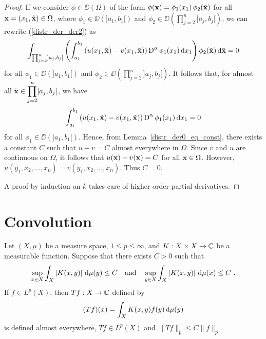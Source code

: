 \begin{proof}
If we consider $\phi \in \DD(\Omega)$ of the form
$\displaystyle \phi(\mathbf{x}) = \phi_1(x_1) \, \phi_2(\tilde{\mathbf{x}})$ for all
$\mathbf{x} = (x_1,\tilde{\mathbf{x}}) \in \Omega$, where
$\phi_1 \in \DD(]a_1,b_1[)$ and
$\displaystyle \phi_2 \in \DD\left(\prod_{j=2}^n]a_j,b_j[\right)$, we
can rewrite (\ref{distr_der_der2}) as
\[
\int_{\prod_{j=2}^n]a_j,b_j[} \left( \int_{a_1}^{b_1}
\left(u(x_1,\tilde{\mathbf{x}}) - v(x_1,\tilde{\mathbf{x}})\right)
\operatorname{D}^\alpha \phi_1(x_1) \,\mathrm{d}{x_1} \right) \phi_2(\tilde{\mathbf{x}})
\,\mathrm{d}{\tilde{\mathbf{x}}} = 0
\]
for all $\phi_1 \in \DD(]a_1,b_1[)$ and
$\displaystyle \phi_2 \in \DD\left(\prod_{j=2}^n]a_j,b_j[\right)$.
It follows that, for almost all
$\displaystyle \tilde{\mathbf{x}} \in \prod_{j=2}^n]a_j,b_j[$, we have
\[
\int_{a_1}^{b_1}
\left(u(x_1,\tilde{\mathbf{x}}) - v(x_1,\tilde{\mathbf{x}})\right) \operatorname{D}^\alpha
\phi_1(x_1) \,\mathrm{d}{x_1} = 0
\]
for all $\phi_1 \in \DD(]a_1,b_1[)$.
Hence, from Lemma~\ref{distr_der0_eq_const}, there exists a constant $C$ such
that $u-v = C$ almost everywhere in $\Omega$.  Since $v$ and $u$ are
continuous on $\Omega$, it follows that
$u(\mathbf{x})-v(\mathbf{x}) = C$ for all $\mathbf{x} \in \Omega$.
However, $u(y_1,x_2,\ldots,x_n) = v(y_1,x_2, \ldots,x_n)$.  Thus
$C=0$.

 A proof by induction on $k$ takes care of
higher order partial derivatives.
\end{proof}

\section{Convolution} \label{sectConvolution}

\begin{theorem} \label{distr_GyoungI}
Let $\left(X,\mu\right)$ be a measure space,
$1\leq p \leq \infty$, and $K:X\times X \rightarrow \mathbb{C}$ be a
measurable function.  Suppose that there exists $C>0$ such that
\[
\sup_{x\in X} \int_X \left|K(x,y)\right| \,\mathrm{d}{\mu(y)} \leq C
\quad \text{and} \quad
\sup_{y\in X} \int_X \left|K(x,y)\right| \,\mathrm{d}{\mu(x)} \leq C \ .
\]
If $\displaystyle f \in L^p(X)$, then $Tf:X\rightarrow \mathbb{C}$ defined by
\[
(Tf)(x) = \int_X K(x,y)f(y) \,\mathrm{d}{\mu(y)}
\]
is defined almost everywhere, $\displaystyle Tf \in L^p(X)$ and
$\displaystyle \| Tf \|_p \leq C \|f\|_p$.
\end{theorem}

